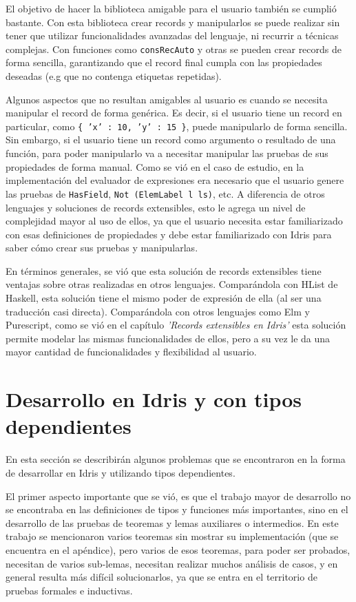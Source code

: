 El objetivo de hacer la biblioteca amigable para el usuario también se cumplió bastante. Con esta biblioteca crear records y manipularlos se puede realizar sin tener que utilizar funcionalidades avanzadas del lenguaje, ni recurrir a técnicas complejas. Con funciones como \texttt{consRecAuto} y otras se pueden crear records de forma sencilla, garantizando que el record final cumpla con las propiedades deseadas (e.g que no contenga etiquetas repetidas). 

Algunos aspectos que no resultan amigables al usuario es cuando se necesita manipular el record de forma genérica. Es decir, si el usuario tiene un record en particular, como \texttt{\{ 'x' : 10, 'y' : 15 \}}, puede manipularlo de forma sencilla. Sin embargo, si el usuario tiene un record como argumento o resultado de una función, para poder manipularlo va a necesitar manipular las pruebas de sus propiedades de forma manual. Como se vió en el caso de estudio, en la implementación del evaluador de expresiones era necesario que el usuario genere las pruebas de \texttt{HasField}, \texttt{Not (ElemLabel l ls)}, etc. A diferencia de otros lenguajes y soluciones de records extensibles, esto le agrega un nivel de complejidad mayor al uso de ellos, ya que el usuario necesita estar familiarizado con esas definiciones de propiedades y debe estar familiarizado con Idris para saber cómo crear sus pruebas y manipularlas.

En términos generales, se vió que esta solución de records extensibles tiene ventajas sobre otras realizadas en otros lenguajes. Comparándola con HList de Haskell, esta solución tiene el mismo poder de expresión de ella (al ser una traducción casi directa). Comparándola con otros lenguajes como Elm y Purescript, como se vió en el capítulo \textit{'Records extensibles en Idris'} esta solución permite modelar las mismas funcionalidades de ellos, pero a su vez le da una mayor cantidad de funcionalidades y flexibilidad al usuario.

\section{Desarrollo en Idris y con tipos dependientes}

En esta sección se describirán algunos problemas que se encontraron en la forma de desarrollar en Idris y utilizando tipos dependientes.

El primer aspecto importante que se vió, es que el trabajo mayor de desarrollo no se encontraba en las definiciones de tipos y funciones más importantes, sino en el desarrollo de las pruebas de teoremas y lemas auxiliares o intermedios. En este trabajo se mencionaron varios teoremas sin mostrar su implementación (que se encuentra en el apéndice), pero varios de esos teoremas, para poder ser probados, necesitan de varios sub-lemas, necesitan realizar muchos análisis de casos, y en general resulta más difícil solucionarlos, ya que se entra en el territorio de pruebas formales e inductivas.

